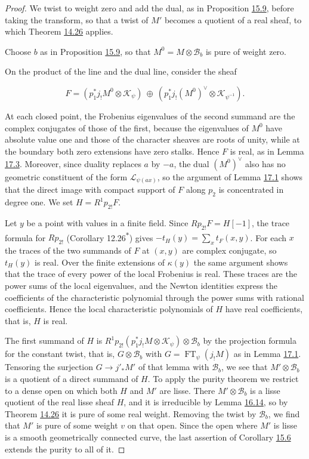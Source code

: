 \documentclass[11pt]{article}
\newcommand{\bpout}[1]{#1\textsuperscript{\hyperlink{bp-outside}{\ensuremath{\ast}}}}
\begin{document}
\begin{proof}[{Proof}]\label{bp235}%
We twist to weight zero and add the dual, as in Proposition \hyperref[bp148]{15.9}, before taking the transform, so that a twist of \(M'\) becomes a quotient of a real sheaf, to which Theorem \hyperref[bp120]{14.26} applies.

Choose \(b\) as in Proposition \hyperref[bp148]{15.9}, so that \(M^0=M\otimes\mathcal B_b\) is pure of weight zero.

On the product of the line and the dual line, consider the sheaf

\[
F=
(p_1^*j_!M^0\otimes\mathcal K_\psi)
\ \oplus\
(p_1^*j_!(M^0)^\vee\otimes\mathcal K_{\psi^{-1}}).
\]

At each closed point, the Frobenius eigenvalues of the second summand are the complex conjugates of those of the first, because the eigenvalues of \(M^0\) have absolute value one and those of the character sheaves are roots of unity, while at the boundary both zero extensions have zero stalks. Hence \(F\) is real, as in Lemma \hyperref[bp231]{17.3}. Moreover, since duality replaces \(a\) by \(-a\), the dual \((M^0)^\vee\) also has no geometric constituent of the form \(\mathcal L_{\psi(ax)}\), so the argument of Lemma \hyperref[bp227]{17.1} shows that the direct image with compact support of \(F\) along \(p_2\) is concentrated in degree one. We set \(H=R^1p_{2!}F\).

Let \(y\) be a point with values in a finite field. Since \(Rp_{2!}F=H[-1]\), the trace formula for \(Rp_{2!}\) (Corollary \bpout{12.26}) gives \(-t_H(y)=\sum_x t_F(x,y)\). For each \(x\) the traces of the two summands of \(F\) at \((x,y)\) are complex conjugate, so \(t_H(y)\) is real. Over the finite extensions of \(\kappa(y)\) the same argument shows that the trace of every power of the local Frobenius is real. These traces are the power sums of the local eigenvalues, and the Newton identities express the coefficients of the characteristic polynomial through the power sums with rational coefficients. Hence the local characteristic polynomials of \(H\) have real coefficients, that is, \(H\) is real.

The first summand of \(H\) is \(R^1p_{2!}(p_1^*j_!M\otimes\mathcal K_\psi)\otimes\mathcal B_b\) by the projection formula for the constant twist, that is, \(G\otimes\mathcal B_b\) with \(G=\operatorname{FT}_\psi(j_!M)\) as in Lemma \hyperref[bp227]{17.1}. Tensoring the surjection \(G\to j'_*M'\) of that lemma with \(\mathcal B_b\), we see that \(M'\otimes\mathcal B_b\) is a quotient of a direct summand of \(H\). To apply the purity theorem we restrict to a dense open on which both \(H\) and \(M'\) are lisse. There \(M'\otimes\mathcal B_b\) is a lisse quotient of the real lisse sheaf \(H\), and it is irreducible by Lemma \hyperref[bp209]{16.14}, so by Theorem \hyperref[bp120]{14.26} it is pure of some real weight. Removing the twist by \(\mathcal B_b\), we find that \(M'\) is pure of some weight \(v\) on that open. Since the open where \(M'\) is lisse is a smooth geometrically connected curve, the last assertion of Corollary \hyperref[bp137]{15.6} extends the purity to all of it.
\end{proof}
\end{document}
